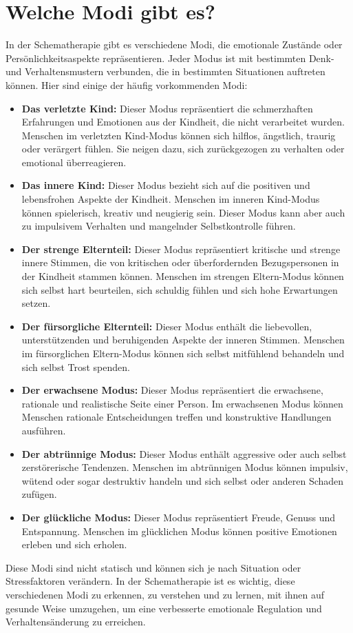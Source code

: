\section{Welche Modi gibt es?}
In der Schematherapie gibt es verschiedene Modi, die emotionale Zustände oder Persönlichkeitsaspekte repräsentieren. Jeder Modus ist mit bestimmten Denk- und Verhaltensmustern verbunden, die in bestimmten Situationen auftreten können. Hier sind einige der häufig vorkommenden Modi:
\begin{itemize}
    \item \textbf{Das verletzte Kind:} Dieser Modus repräsentiert die schmerzhaften Erfahrungen und Emotionen aus der Kindheit, die nicht verarbeitet wurden. Menschen im verletzten Kind-Modus können sich hilflos, ängstlich, traurig oder verärgert fühlen. Sie neigen dazu, sich zurückgezogen zu verhalten oder emotional überreagieren.
    \item \textbf{Das innere Kind:} Dieser Modus bezieht sich auf die positiven und lebensfrohen Aspekte der Kindheit. Menschen im inneren Kind-Modus können spielerisch, kreativ und neugierig sein. Dieser Modus kann aber auch zu impulsivem Verhalten und mangelnder Selbstkontrolle führen. 
    \item \textbf{Der strenge Elternteil:} Dieser Modus repräsentiert kritische und strenge innere Stimmen, die von kritischen oder überfordernden Bezugspersonen in der Kindheit stammen können. Menschen im strengen Eltern-Modus können sich selbst hart beurteilen, sich schuldig fühlen und sich hohe Erwartungen setzen.
    \item \textbf{Der fürsorgliche Elternteil:} Dieser Modus enthält die liebevollen, unterstützenden und beruhigenden Aspekte der inneren Stimmen. Menschen im fürsorglichen Eltern-Modus können sich selbst mitfühlend behandeln und sich selbst Trost spenden.
    \item \textbf{Der erwachsene Modus:} Dieser Modus repräsentiert die erwachsene, rationale und realistische Seite einer Person. Im erwachsenen Modus können Menschen rationale Entscheidungen treffen und konstruktive Handlungen ausführen.
    \item \textbf{Der abtrünnige Modus:} Dieser Modus enthält aggressive oder auch selbst zerstörerische Tendenzen. Menschen im abtrünnigen Modus können impulsiv, wütend oder sogar destruktiv handeln und sich selbst oder anderen Schaden zufügen.
    \item \textbf{Der glückliche Modus:} Dieser Modus repräsentiert Freude, Genuss und Entspannung. Menschen im glücklichen Modus können positive Emotionen erleben und sich erholen.
\end{itemize}
Diese Modi sind nicht statisch und können sich je nach Situation oder Stressfaktoren verändern. In der Schematherapie ist es wichtig, diese verschiedenen Modi zu erkennen, zu verstehen und zu lernen, mit ihnen auf gesunde Weise umzugehen, um eine verbesserte emotionale Regulation und Verhaltensänderung zu erreichen.
